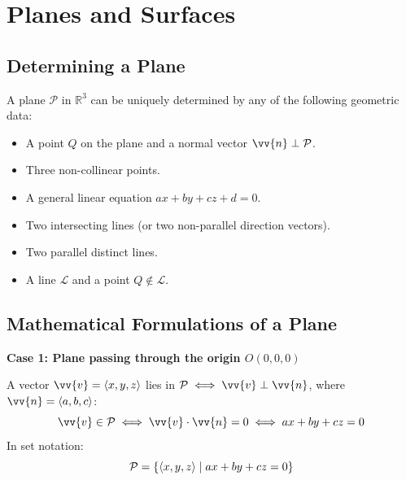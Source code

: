 \section{Planes and Surfaces}

\subsection{Determining a Plane}

A plane $\mathcal{P}$ in $\mathbb{R}^3$ can be uniquely determined by any of the following geometric data:
\begin{itemize}
    \item A point $Q$ on the plane and a normal vector $\vv{n} \perp \mathcal{P}$.
    \item Three non-collinear points.
    \item A general linear equation $ax + by + cz + d = 0$.
    \item Two intersecting lines (or two non-parallel direction vectors).
    \item Two parallel distinct lines.
    \item A line $\mathcal{L}$ and a point $Q \notin \mathcal{L}$.
\end{itemize}

\subsection{Mathematical Formulations of a Plane}

\textbf{Case 1: Plane passing through the origin $O(0,0,0)$}

A vector $\vv{v} = \ang{x, y, z}$ lies in $\mathcal{P} \iff \vv{v} \perp \vv{n}$, where $\vv{n} = \ang{a, b, c}$:
\[
\vv{v} \in \mathcal{P} \iff \vv{v} \cdot \vv{n} = 0 \iff ax + by + cz = 0
\]
In set notation:
\[
\mathcal{P} = \{ \left\langle x, y, z \right\rangle \mid ax + by + cz = 0 \}
\]

